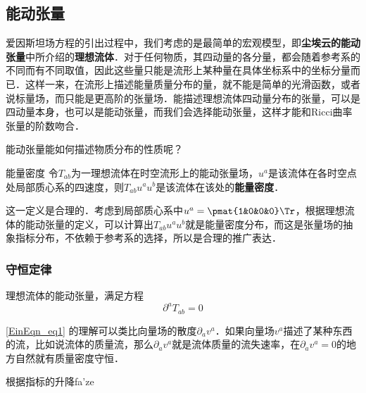 

\subsection{能动张量}

爱因斯坦场方程的引出过程中，我们考虑的是最简单的宏观模型，即\textbf{尘埃云的能动张量}中所介绍的\textbf{理想流体}．对于任何物质，其四动量的各分量，都会随着参考系的不同而有不同取值，因此这些量只能是流形上某种量在具体坐标系中的坐标分量而已．这样一来，在流形上描述能量质量分布的量，就不能是简单的光滑函数，或者说标量场，而只能是更高阶的张量场．能描述理想流体四动量分布的张量，可以是四动量本身，也可以是能动张量，而我们会选择能动张量，这样才能和Ricci曲率张量的阶数吻合．

能动张量能如何描述物质分布的性质呢？

\begin{definition}{能量密度}
令$T_{ab}$为一理想流体在时空流形上的能动张量场，$u^a$是该流体在各时空点处局部质心系的四速度，则$T_{ab}u^au^b$是该流体在该处的\textbf{能量密度}．
\end{definition}

这一定义是合理的．考虑到局部质心系中$u^a=\pmat{1&0&0&0}\Tr$，根据理想流体的能动张量的定义，可以计算出$T_{ab}u^au^b$就是能量密度分布，而这是张量场的抽象指标分布，不依赖于参考系的选择，所以是合理的推广表达．

\subsubsection{守恒定律}

理想流体的能动张量，满足方程
\begin{equation}\label{EinEqn_eq1}
\partial^aT_{ab}=0
\end{equation}

\autoref{EinEqn_eq1} 的理解可以类比向量场的散度$\partial_av^a$．如果向量场$v^a$描述了某种东西的流，比如说流体的质量流，那么$\partial_av^a$就是流体质量的流失速率，在$\partial_av^a=0$的地方自然就有质量密度守恒．

根据指标的升降fa'ze












